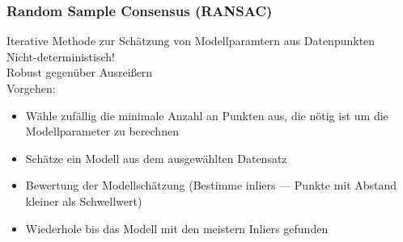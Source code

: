 \subsubsection{Random Sample Consensus (RANSAC)}
Iterative Methode zur Schätzung von Modellparamtern aus Datenpunkten\\
Nicht-deterministisch!\\
Robust gegenüber Ausreißern\\
Vorgehen:
\begin{itemize}
\item Wähle zufällig die minimale Anzahl an Punkten aus, die nötig ist um die Modellparameter zu berechnen
\item Schätze ein Modell aus dem ausgewählten Datensatz
\item Bewertung der Modellschätzung (Bestimme inliers --- Punkte mit Abstand kleiner als Schwellwert)
\item Wiederhole bis das Modell mit den meistern Inliers gefunden
\end{itemize}